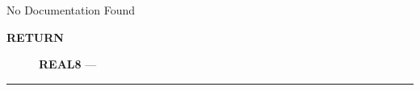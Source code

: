 \par





No Documentation Found








\par
\begin{description}
\item [\colorbox{tagtype}{\color{white} \textbf{\textsf{RETURN}}}] \textbf{REAL8} --- 
\end{description}




\rule{\linewidth}{0.5pt}


